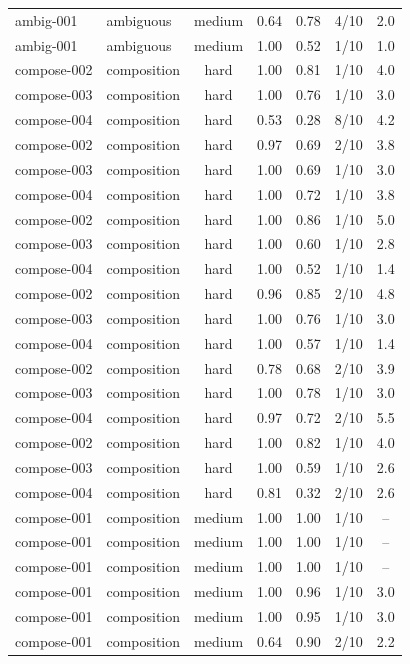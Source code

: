 \begin{table}[t]
\begin{tabular}{llccccc}
ambig-001 & ambiguous & medium & 0.64 & 0.78 & 4/10 & 2.0 \\
ambig-001 & ambiguous & medium & 1.00 & 0.52 & 1/10 & 1.0 \\
compose-002 & composition & hard & 1.00 & 0.81 & 1/10 & 4.0 \\
compose-003 & composition & hard & 1.00 & 0.76 & 1/10 & 3.0 \\
compose-004 & composition & hard & 0.53 & 0.28 & 8/10 & 4.2 \\
compose-002 & composition & hard & 0.97 & 0.69 & 2/10 & 3.8 \\
compose-003 & composition & hard & 1.00 & 0.69 & 1/10 & 3.0 \\
compose-004 & composition & hard & 1.00 & 0.72 & 1/10 & 3.8 \\
compose-002 & composition & hard & 1.00 & 0.86 & 1/10 & 5.0 \\
compose-003 & composition & hard & 1.00 & 0.60 & 1/10 & 2.8 \\
compose-004 & composition & hard & 1.00 & 0.52 & 1/10 & 1.4 \\
compose-002 & composition & hard & 0.96 & 0.85 & 2/10 & 4.8 \\
compose-003 & composition & hard & 1.00 & 0.76 & 1/10 & 3.0 \\
compose-004 & composition & hard & 1.00 & 0.57 & 1/10 & 1.4 \\
compose-002 & composition & hard & 0.78 & 0.68 & 2/10 & 3.9 \\
compose-003 & composition & hard & 1.00 & 0.78 & 1/10 & 3.0 \\
compose-004 & composition & hard & 0.97 & 0.72 & 2/10 & 5.5 \\
compose-002 & composition & hard & 1.00 & 0.82 & 1/10 & 4.0 \\
compose-003 & composition & hard & 1.00 & 0.59 & 1/10 & 2.6 \\
compose-004 & composition & hard & 0.81 & 0.32 & 2/10 & 2.6 \\
compose-001 & composition & medium & 1.00 & 1.00 & 1/10 & -- \\
compose-001 & composition & medium & 1.00 & 1.00 & 1/10 & -- \\
compose-001 & composition & medium & 1.00 & 1.00 & 1/10 & -- \\
compose-001 & composition & medium & 1.00 & 0.96 & 1/10 & 3.0 \\
compose-001 & composition & medium & 1.00 & 0.95 & 1/10 & 3.0 \\
compose-001 & composition & medium & 0.64 & 0.90 & 2/10 & 2.2 \\

\end{tabular}
\end{table}
